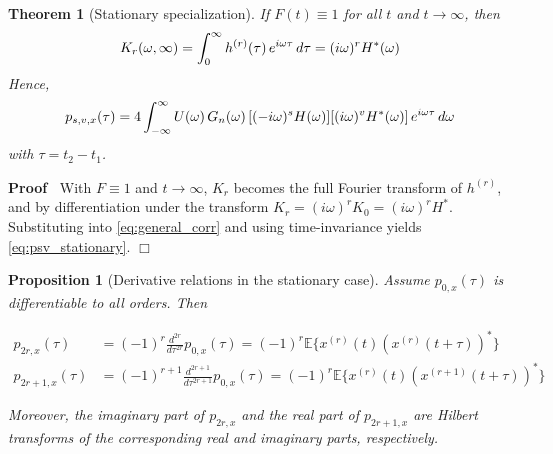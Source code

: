\documentclass{article}
\newenvironment{proof}{\noindent\textbf{Proof\ }}{\hspace*{\fill}$\Box$\medskip}
\newtheorem{proposition}{Proposition}
\newtheorem{theorem}{Theorem}
\begin{document}
\begin{theorem}
  [Stationary specialization]\label{thm:stationary_specialization} If $F (t)
  \equiv 1$ for all $t$ and $t \to \infty$, then
  \begin{equation}
    \label{eq:Kr_stationary} K_r (\omega, \infty) = \int_0^{\infty} h^{(r)}
    (\tau)  \hspace{0.17em} e^{i \omega \tau}  \hspace{0.17em} d \tau = (i
    \omega)^r H^{\ast} (\omega)
  \end{equation}
  Hence,
  \begin{equation}
    \label{eq:psv_stationary} p_{s, v, x} (\tau) = 4 \int_{- \infty}^{\infty}
    U (\omega)  \hspace{0.17em} G_n (\omega)  \hspace{0.17em} [(- i \omega)^s
    H (\omega)]  [(i \omega)^v H^{\ast} (\omega)]  \hspace{0.17em} e^{i \omega
    \tau}  \hspace{0.17em} d \omega
  \end{equation}
  with $\tau = t_2 - t_1$.
\end{theorem}

\begin{proof}
  With $F \equiv 1$ and $t \to \infty$, $K_r$ becomes the full Fourier
  transform of $h^{(r)}$, and by differentiation under the transform $K_r = (i
  \omega)^r K_0 = (i \omega)^r H^{\ast}$. Substituting into
  \eqref{eq:general_corr} and using time-invariance yields
  \eqref{eq:psv_stationary}.
\end{proof}

\begin{proposition}[Derivative relations in the stationary case]
  \label{prop:derivative_rel}Assume $p_{0, x} (\tau)$ is differentiable to all
  orders. Then
  
  \begin{align}
    p_{2 r, x} (\tau) & = (- 1)^r \frac{d^{2 r}}{d \tau^{2 r}} p_{0, x} (\tau)
    = (- 1)^r \mathbb{E} \{x^{(r)} (t) (x^{(r)} (t + \tau))^{\ast} \} \\
    p_{2 r + 1, x} (\tau) & = (- 1)^{r + 1} \frac{d^{2 r + 1}}{d \tau^{2 r +
    1}} p_{0, x} (\tau) = (- 1)^r \mathbb{E} \{x^{(r)} (t) (x^{(r + 1)} (t +
    \tau))^{\ast} \} 
  \end{align}
  
  Moreover, the imaginary part of $p_{2 r, x}$ and the real part of $p_{2 r +
  1, x}$ are Hilbert transforms of the corresponding real and imaginary parts,
  respectively.
\end{proposition}
\end{document}
